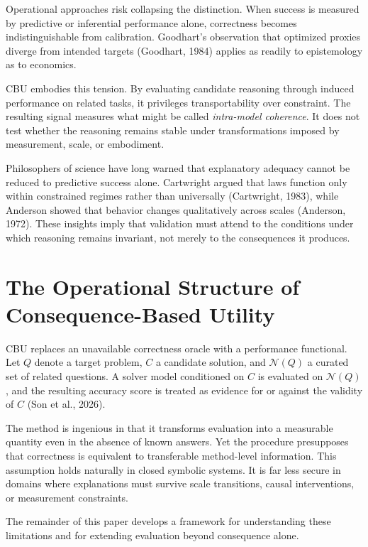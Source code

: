 \documentclass[11pt]{article}
\begin{document}
Operational approaches risk collapsing the distinction. When success is measured by predictive or inferential performance alone, correctness becomes indistinguishable from calibration. Goodhart's observation that optimized proxies diverge from intended targets (Goodhart, 1984) applies as readily to epistemology as to economics.

CBU embodies this tension. By evaluating candidate reasoning through induced performance on related tasks, it privileges transportability over constraint. The resulting signal measures what might be called \emph{intra-model coherence}. It does not test whether the reasoning remains stable under transformations imposed by measurement, scale, or embodiment.

Philosophers of science have long warned that explanatory adequacy cannot be reduced to predictive success alone. Cartwright argued that laws function only within constrained regimes rather than universally (Cartwright, 1983), while Anderson showed that behavior changes qualitatively across scales (Anderson, 1972). These insights imply that validation must attend to the conditions under which reasoning remains invariant, not merely to the consequences it produces.

\section{The Operational Structure of Consequence-Based Utility}

CBU replaces an unavailable correctness oracle with a performance functional. Let \(Q\) denote a target problem, \(C\) a candidate solution, and \(\mathcal{N}(Q)\) a curated set of related questions. A solver model conditioned on \(C\) is evaluated on \(\mathcal{N}(Q)\), and the resulting accuracy score is treated as evidence for or against the validity of \(C\) (Son et al., 2026).

The method is ingenious in that it transforms evaluation into a measurable quantity even in the absence of known answers. Yet the procedure presupposes that correctness is equivalent to transferable method-level information. This assumption holds naturally in closed symbolic systems. It is far less secure in domains where explanations must survive scale transitions, causal interventions, or measurement constraints.

The remainder of this paper develops a framework for understanding these limitations and for extending evaluation beyond consequence alone.
\end{document}
